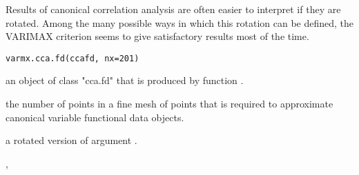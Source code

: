 \documentclass{article}
\begin{document}
\begin{Examples}
\begin{ExampleCode}
\end{ExampleCode}
\end{Examples}

\begin{Description}\relax
Results of canonical correlation analysis are often easier to interpret if
they are rotated.  Among the many possible ways in which this rotation can be
defined, the VARIMAX criterion seems to give satisfactory results most
of the time.
\end{Description}
\begin{Usage}
\begin{verbatim}
varmx.cca.fd(ccafd, nx=201)
\end{verbatim}
\end{Usage}
\begin{Arguments}
\begin{ldescription}
\item[\code{ccafd}] an object of class "cca.fd" that is produced by function
.

\item[\code{nx}] the number of points in a fine mesh of points that is
required to approximate canonical variable functional
data objects.

\end{ldescription}
\end{Arguments}
\begin{Value}
a rotated version of argument .
\end{Value}
\begin{SeeAlso}\relax
{}, 
\end{SeeAlso}
\end{document}
